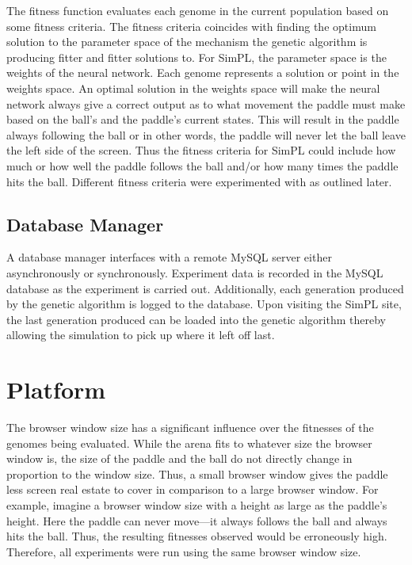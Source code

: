 The fitness function evaluates each genome in the current population based on some fitness criteria. The fitness criteria coincides with finding the optimum solution to the parameter space of the mechanism the genetic algorithm is producing fitter and fitter solutions to. For SimPL, the parameter space is the weights of the neural network. Each genome represents a solution or point in the weights space. An optimal solution in the weights space will make the neural network always give a correct output as to what movement the paddle must make based on the ball's and the paddle's current states. This will result in the paddle always following the ball or in other words, the paddle will never let the ball leave the left side of the screen. Thus the fitness criteria for SimPL could include how much or how well the paddle follows the ball and/or how many times the paddle hits the ball. Different fitness criteria were experimented with as outlined later. 


\subsection{Database Manager}

A database manager interfaces with a remote MySQL server either asynchronously or synchronously. Experiment data is recorded in the MySQL database as the experiment is carried out. Additionally, each generation produced by the genetic algorithm is logged to the database. Upon visiting the SimPL site, the last generation produced can be loaded into the genetic algorithm thereby allowing the simulation to pick up where it left off last.  

\section{Platform}

The browser window size has a significant influence over the fitnesses of the genomes being evaluated. While the arena fits to whatever size the browser window is, the size of the paddle and the ball do not directly change in proportion to the window size. Thus, a small browser window gives the paddle less screen real estate to cover in comparison to a large browser window. For example, imagine a browser window size with a height as large as the paddle's height. Here the paddle can never move---it always follows the ball and always hits the ball. Thus, the resulting fitnesses observed would be erroneously high. Therefore, all experiments were run using the same browser window size. 

